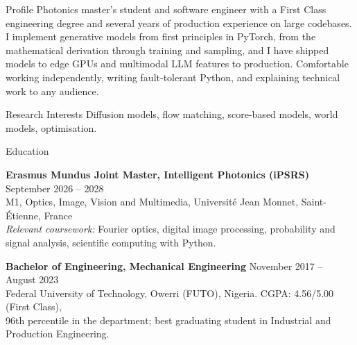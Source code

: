 \documentclass{resume}
\begin{document}
\begin{rSection}{Profile}
Photonics master's student and software engineer with a First Class engineering degree and several
years of production experience on large codebases. I implement generative models from first
principles in PyTorch, from the mathematical derivation through training and sampling, and I have
shipped models to edge GPUs and multimodal LLM features to production. Comfortable working
independently, writing fault-tolerant Python, and explaining technical work to any audience.
\end{rSection}

\begin{rSection}{Research Interests}
Diffusion models, flow matching, score-based models, world models, optimisation.
\end{rSection}

\begin{rSection}{Education}

{\bf Erasmus Mundus Joint Master, Intelligent Photonics (iPSRS)} \hfill {September 2026 -- 2028}\\
M1, Optics, Image, Vision and Multimedia, Université Jean Monnet, Saint-Étienne, France\\
\textit{Relevant coursework:} Fourier optics, digital image processing, probability and signal analysis, scientific computing with Python.

{\bf Bachelor of Engineering, Mechanical Engineering} \hfill {November 2017 -- August 2023}\\
Federal University of Technology, Owerri (FUTO), Nigeria. CGPA: 4.56/5.00 (First Class),\\
96th percentile in the department; best graduating student in Industrial and Production Engineering.

\end{rSection}
\end{document}
